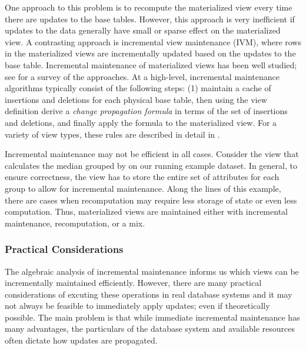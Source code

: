 One approach to this problem is to recompute the materialized view every time there are updates to the base tables.
However, this approach is very inefficient if updates to the data generally have small or sparse effect on the materialized view. 
A contrasting approach is incremental view maintenance (IVM), where rows in the materialized views are incrementally updated based on the updates to the base table.
Incremental maintenance of materialized views has been well studied; see \cite{chirkova2011materialized} for a survey of the approaches. 
At a high-level, incremental maintenance algorithms typically consist of the following steps: (1) maintain a cache of insertions and deletions for each physical base table, then using the view definition derive a \emph{change propagation formula} in terms of the set of insertions and deletions, and finally apply the formula to the materialized view.
For a variety of view types, these rules are described in detail in \cite{DBLP:journals/vldb/KochAKNNLS14, DBLP:conf/pods/Koch10}.

Incremental maintenance may not be efficient in all cases.
Consider the view that calculates the median  grouped by  on our running example dataset.
In general, to ensure correctness, the view has to store the entire set of  attributes for each group to allow for incremental maintenance.
Along the lines of this example, there are cases when recomputation may require less storage of state or even less computation.
Thus, materialized views are maintained either with incremental maintenance, recomputation, or a mix.

\subsubsection{Practical Considerations}
The algebraic analysis of incremental maintenance \cite{DBLP:journals/vldb/KochAKNNLS14, DBLP:conf/pods/Koch10} informs us which views can be incrementally maintained efficiently.
However, there are many practical considerations of excuting these operations in real database systems and it may not always be feasible to immediately apply updates; even if theoretically possible.
The main problem is that while immediate incremental maintenance has many advantages, the particulars of the database system and available resources often dictate how updates are propagated.

